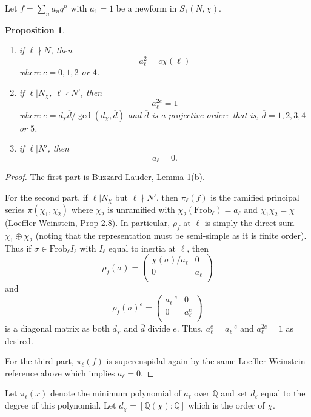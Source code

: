\documentclass[11pt]{amsart}
\theoremstyle{plain}
\newtheorem{prop}[thm]{Proposition}
\theoremstyle{definition}
\newcommand{\Q}{{\mathbb Q}}
\newcommand{\Frob}{\text{Frob}}
\renewcommand{\[}{\left[}
\renewcommand{\]}{\right]}
\begin{document}
Let $f = \sum_n a_n q^n$ with $a_1=1$ be a newform in $S_1(N,\chi)$.\\

\begin{prop}~\\
\begin{enumerate}
\item if $\ell \nmid N$, then 
$$
a_\ell^2 = c \chi(\ell)
$$
where $c=0,1,2$ or $4$.

\item if $\ell | N_\chi$, $\ell \nmid N'$, then
$$
a_\ell^{2e} = 1
$$ 
where $e = d_\chi \overline{d} / \gcd(d_\chi,\overline{d})$ and $\overline{d}$ is a projective order:\ that is, $\overline{d} = 1,2,3,4$ or $5$.

\item if $\ell | N'$, then
$$
a_\ell = 0.
$$
\end{enumerate}
\end{prop}

\begin{proof}
The first part is Buzzard-Lauder, Lemma 1(b).

For the second part, if $\ell | N_\chi$ but $\ell \nmid N'$, then $\pi_\ell(f)$ is the ramified principal series $\pi(\chi_1,\chi_2)$ where $\chi_2$ is unramified with $\chi_2(\Frob_\ell) = a_\ell$ and $\chi_1 \chi_2 = \chi$ (Loeffler-Weinstein, Prop 2.8).  In particular, $\rho_f$ at $\ell$ is simply the direct sum $\chi_1 \oplus \chi_2$ (noting that the representation must be semi-simple as it is finite order).  Thus if $\sigma \in \Frob_\ell I_\ell$ with $I_\ell$ equal to inertia at $\ell$, then
$$
\rho_f(\sigma) = 
\begin{pmatrix}
\chi(\sigma)/a_{\ell} & 0 \\
0 & a_\ell \\
\end{pmatrix}
$$
and
$$
\rho_f(\sigma)^e = 
\begin{pmatrix}
a_{\ell}^{-e} & 0 \\
0 & a_\ell^e \\
\end{pmatrix}
$$
is a diagonal matrix as both $d_\chi$ and $\overline{d}$ divide $e$.  Thus, $a_\ell^{e} = a_{\ell}^{-e}$ and $a_{\ell}^{2e} =1$ as desired.

For the third part, $\pi_\ell(f)$ is supercuspidal again by the same Loeffler-Weinstein reference above which implies $a_\ell=0$.
\end{proof}

Let $\pi_{\ell}(x)$ denote the minimum polynomial of $a_\ell$ over $\Q$ and set $d_\ell$ equal to the degree of this polynomial.  Let $d_\chi = [\Q(\chi) : \Q]$ which is the order of $\chi$.
\end{document}
